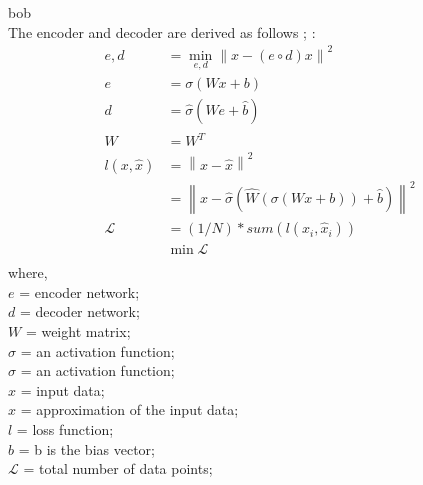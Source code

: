 \documentclass[12pt]{article}
\begin{document}
\newpage
bob\\
The encoder and decoder are derived as follows \parencite{Sigal_2017}; \parencite{stewart_2023}:
\begin{equation}
  \begin{aligned}
    e,d           & = \min_{e,d}  \left\lVert x-(e\circ d)x \right\rVert^2                           \\
    e             & = \sigma(Wx + b)                                                                 \\
    d             & = \hat{\sigma}(\hat{W}e + \hat{b})                                               \\
    \hat{W}       & = W^{T}                                                                          \\
    l (x,\hat{x}) & = \left\lVert x-\hat{x} \right\rVert ^2                                          \\
                  & = \left\lVert x - \hat{\sigma}(\hat{W}(\sigma(Wx + b))+ \hat{b}) \right\rVert ^2 \\
    \mathcal{L}   & = (1/N) * sum(l(x_i, \hat{x}_i))                                                 \\
                  & \min \mathcal{L}                                                                 \\
  \end{aligned}
\end{equation}
where,\\
$e$ = encoder network; \\
$d$ = decoder network;\\
$W$ = weight matrix;\\
$\sigma$ = an activation function; \\
$\hat{\sigma}$ = an activation function; \\
$x$ = input data;\\
$\hat{x}$ = approximation of the input data;\\
$l$ = loss function; \\
$b$ = b is the bias vector;\\
$\mathcal{L}$ = total number of data points;\\
\newpage
\printbibliography
\end{document}
